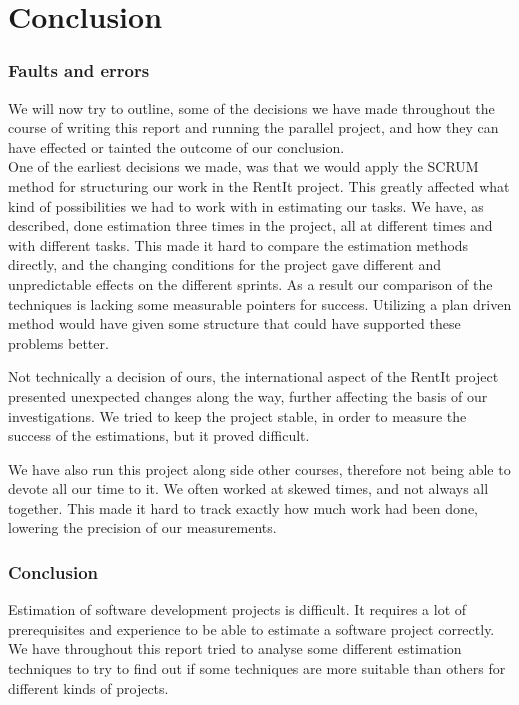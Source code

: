 \part{Conclusion}
\section{Faults and errors}
We will now try to outline, some of the decisions we have made throughout the course of writing this report and running the parallel project, and how they can have effected or tainted the outcome of our conclusion.\\

One of the earliest decisions we made, was that we would apply the SCRUM method for structuring our work in the RentIt project. This greatly affected what kind of possibilities we had to work with in estimating our tasks. We have, as described, done estimation three times in the project, all at different times and with different tasks. This made it hard to compare the estimation methods directly, and the changing conditions for the project gave different and unpredictable effects on the different sprints. As a result our comparison of the techniques is lacking some measurable pointers for success. Utilizing a plan driven method would have given some structure that could have supported these problems better.

Not technically a decision of ours, the international aspect of the RentIt project presented unexpected changes along the way, further affecting the basis of our investigations. We tried to keep the project stable, in order to measure the success of the estimations, but it proved difficult.

We have also run this project along side other courses, therefore not being able to devote all our time to it. We often worked at skewed times, and not always all together. This made it hard to track exactly how much work had been done, lowering the precision of our measurements.

\section{Conclusion}
Estimation of software development projects is difficult. It requires a lot of prerequisites and experience to
be able to estimate a software project correctly. We have throughout this report tried to analyse some different
estimation techniques to try to find out if some techniques are more suitable than others for different kinds of
projects.\\

